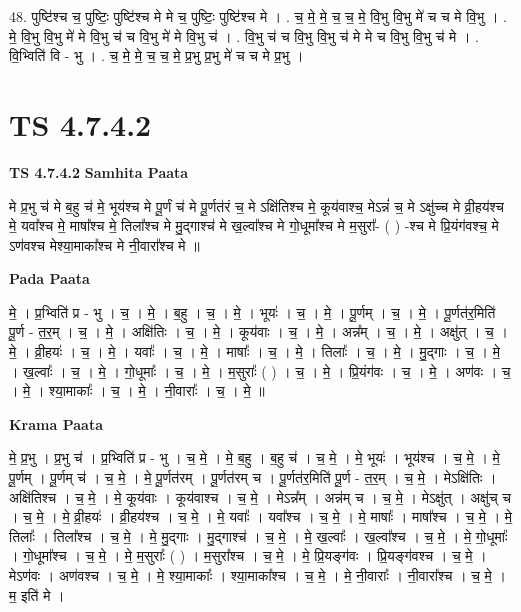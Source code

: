\documentclass[17pt]{extarticle}
\begin{document}
48. पुष्टि॑श्च च॒ पुष्टिः॒ पुष्टि॑श्च मे मे च॒ पुष्टिः॒ पुष्टि॑श्च मे । . च॒ मे॒ मे॒ च॒ च॒ मे॒ वि॒भु वि॒भु मे॑ च च मे वि॒भु । . मे॒ वि॒भु वि॒भु मे॑ मे वि॒भु च॑ च वि॒भु मे॑ मे वि॒भु च॑ । . वि॒भु च॑ च वि॒भु वि॒भु च॑ मे मे च वि॒भु वि॒भु च॑ मे । . वि॒भ्विति॑ वि - भु । . च॒ मे॒ मे॒ च॒ च॒ मे॒ प्र॒भु प्र॒भु मे॑ च च मे प्र॒भु । \newline
\pagebreak
{}

\section{ TS 4.7.4.2 }

\textbf{TS 4.7.4.2 } \newline
\textbf{Samhita Paata} \newline

मे प्र॒भु च॑ मे ब॒हु च॑ मे॒ भूय॑श्च मे पू॒र्णं च॑ मे पू॒र्णत॑रं च॒ मे   ऽक्षि॑तिश्च मे॒ कूय॑वाश्च॒ मेऽन्नं॑ च॒ मे ऽक्षु॑च्च मे व्री॒हय॑श्च मे॒       यवा᳚श्च मे॒ माषा᳚श्च मे॒ तिला᳚श्च मे मु॒द्गाश्च॑ मे ख॒ल्वा᳚श्च मे गो॒धूमा᳚श्च मे म॒सुरा᳚- ( ) -श्च मे प्रि॒यंग॑वश्च॒ मे ऽण॑वश्च मेश्या॒माका᳚श्च मे नी॒वारा᳚श्च मे ॥ \newline

\textbf{Pada Paata} \newline

मे॒ । प्र॒भ्विति॑ प्र - भु । च॒ । मे॒ । ब॒हु । च॒ । मे॒ । भूयः॑ । च॒ । मे॒ । पू॒र्णम् । च॒ । मे॒ । पू॒र्णत॑र॒मिति॑ पू॒र्ण - त॒र॒म् । च॒ । मे॒ । अक्षि॑तिः । च॒ । मे॒ । कूय॑वाः । च॒ । मे॒ । अन्न᳚म् । च॒ । मे॒ । अक्षु॑त् । च॒ । मे॒ । व्री॒हयः॑ । च॒ । मे॒ । यवाः᳚ । च॒ । मे॒ । माषाः᳚ । च॒ । मे॒ । तिलाः᳚ । च॒ । मे॒ । मु॒द्गाः । च॒ । मे॒ । ख॒ल्वाः᳚ । च॒ । मे॒ । गो॒धूमाः᳚ । च॒ । मे॒ । म॒सुराः᳚ ( ) । च॒ । मे॒ । प्रि॒यंग॑वः । च॒ । मे॒ । अण॑वः । च॒ । मे॒ । श्या॒माकाः᳚ । च॒ । मे॒ । नी॒वाराः᳚ । च॒ । मे॒ ॥  \newline


\textbf{Krama Paata} \newline

मे॒ प्र॒भु । प्र॒भु च॑ । प्र॒भ्विति॑ प्र - भु । च॒ मे॒ । मे॒ ब॒हु । ब॒हु च॑ । च॒ मे॒ । मे॒ भूयः॑ । भूय॑श्च । च॒ मे॒ । मे॒ पू॒र्णम् । पू॒र्णम् च॑ । च॒ मे॒ । मे॒ पू॒र्णत॑रम् । पू॒र्णत॑रम् च । पू॒र्णत॑र॒मिति॑ पू॒र्ण - त॒र॒म् । च॒ मे॒ । मेऽक्षि॑तिः । अक्षि॑तिश्च । च॒ मे॒ । मे॒ कूय॑वाः । कूय॑वाश्च । च॒ मे॒ । मेऽन्न᳚म् । अन्न॑म् च । च॒ मे॒ । मेऽक्षु॑त् । अक्षु॑च् च । च॒ मे॒ । मे॒ व्री॒हयः॑ । व्री॒हय॑श्च । च॒ मे॒ । मे॒ यवाः᳚ । यवा᳚श्च । च॒ मे॒ । मे॒ माषाः᳚ । माषा᳚श्च । च॒ मे॒ । मे॒ तिलाः᳚ । तिला᳚श्च । च॒ मे॒ । मे॒ मु॒द्गाः । मु॒द्गाश्च॑ । च॒ मे॒ । मे॒ ख॒ल्वाः᳚ । ख॒ल्वा᳚श्च । च॒ मे॒ । मे॒ गो॒धूमाः᳚ । गो॒धूमा᳚श्च । च॒ मे॒ । मे॒ म॒सुराः᳚ ( ) । म॒सुरा᳚श्च । च॒ मे॒ । मे॒ प्रि॒यङ्ग॑वः । प्रि॒यङ्ग॑वश्च । च॒ मे॒ । मेऽण॑वः । अण॑वश्च । च॒ मे॒ । मे॒ श्या॒माकाः᳚ । श्या॒माका᳚श्च । च॒ मे॒ । मे॒ नी॒वाराः᳚ । नी॒वारा᳚श्च । च॒ मे॒ । म॒ इति॑ मे । \newline
\end{document}
